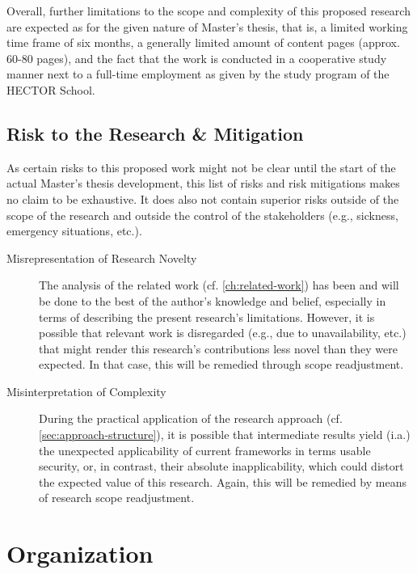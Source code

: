 Overall, further limitations to the scope and complexity of this proposed research are expected as for the given nature of Master's thesis, that is, a limited working time frame of six months, a generally limited amount of content pages (approx. 60-80 pages), and the fact that the work is conducted in a cooperative study manner next to a full-time employment as given by the study program of the HECTOR School.

\section{Risk to the Research \& Mitigation} \label{sec:approach-risks}

As certain risks to this proposed work might not be clear until the start of the actual Master's thesis development, this list of risks and risk mitigations makes no claim to be exhaustive. It does also not contain superior risks outside of the scope of the research and outside the control of the stakeholders (e.g., sickness, emergency situations, etc.). 

\begin{description}
	\item[Misrepresentation of Research Novelty] The analysis of the related work (cf. \autoref{ch:related-work}) has been and will be done to the best of the author's knowledge and belief, especially in terms of describing the present research's limitations. However, it is possible that relevant work is disregarded (e.g., due to unavailability, etc.) that might render this research's contributions less novel than they were expected. In that case, this will be remedied through scope readjustment.
	\item[Misinterpretation of Complexity] During the practical application of the research approach (cf. \autoref{sec:approach-structure}), it is possible that intermediate results yield (i.a.) the unexpected applicability of current frameworks in terms usable security, or, in contrast, their absolute inapplicability, which could distort the expected value of this research. Again, this will be remedied by means of research scope readjustment.
\end{description}


\chapter{Organization}
\label{ch:organization}

